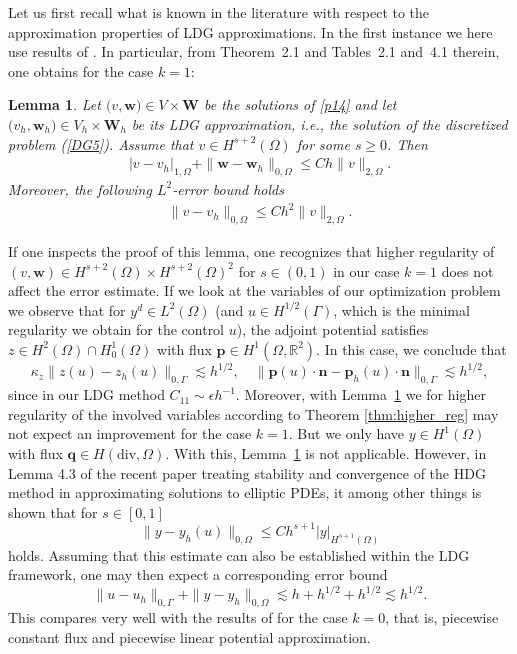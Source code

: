 \documentclass[a4paper,10pt]{article}
\newcommand{\bq}{{\mathbf{q}}}
\newcommand{\bw}{{\mathbf{w}}}
\newcommand{\bp}{{\mathbf{p}}}
\newcommand{\bn}{{\mathbf{n}}}
\newcommand{\bW}{{\mathbf{W}}}
\newtheorem{lemma}[theorem]{Lemma}
\numberwithin{theorem}{section}
\newcommand{\z}[2][blue]{#2}
\begin{document}
Let us first recall what is known in the literature with respect to the approximation properties of LDG approximations. In the first instance we here use results of \cite{PCastillo_BCockburn_IPergugia_DSchotzau_2000}. In particular, from Theorem~2.1 and Tables~2.1 and~4.1 therein, one obtains for the case $k=1$:
\begin{lemma}\label{smooth-solutions}
Let $\big(v,\bw \big) \in V \times \bW$ be the solutions of \eqref{p14} and let $\big(v_h,\bw_h \big) \in V_h \times \bW_h$ be its LDG approximation, i.e., the solution of the discretized problem  (\ref{DG5}). Assume that $v \in H^{s+2}(\Omega)$ for some $s\ge 0$. Then
\begin{eqnarray}\label{lemmaState1}
  |v-v_h|_{1,\Omega} + \|\bw-\bw_h\|_{0,\Omega} \leq C h \|v\|_{2,\Omega}.
\end{eqnarray}
Moreover, the following $L^2$-error bound holds
\begin{eqnarray}\label{lemmaState2}
  \|v-v_h\|_{0,\Omega}  \leq C h^2\|v\|_{2,\Omega}.
\end{eqnarray}
\end{lemma}
If one inspects the proof of this lemma, one recognizes that higher regularity of $(v,\bw)\in H^{s+2}(\Omega)\times H^{s+2}(\Omega)^2$ for $s\in (0,1)$ in our case $k=1$ does not affect the error estimate.
If we look at the variables of our optimization problem we observe that for $y^d\in L^2(\Omega)$ (and $u\in H^{1/2}(\Gamma)$, which is the minimal regularity we obtain for the control $u$), the adjoint potential satisfies $z\in H^2(\Omega)\cap H^1_0(\Omega)$ with flux $\bp\in H^1(\Omega,\mathbb{R}^2)$. In this case, we conclude that
\[
\kappa_z\|z(u)-z_h(u)\|_{0,\Gamma} \lesssim h^{1/2}, \quad \|\bp(u)\cdot \bn-\bp_h(u) \cdot \bn\|_{0,\Gamma} \lesssim h^{1/2},
\]
since in our LDG method $C_{11} \sim \epsilon h^{-1}$. Moreover, with Lemma~\ref{smooth-solutions} we for higher regularity of the involved variables according to Theorem \ref{thm:higher_reg} may not expect an improvement for the case $k=1$.
But we only have $y\in H^1(\Omega)$ with flux $\bq \in H(\mathrm{div},\Omega)$. With this, Lemma~\ref{smooth-solutions} is not applicable. However, in Lemma 4.3 of the recent paper \cite{JJiang_NJWalkington_YYue_2025} treating stability and convergence of the HDG method in approximating solutions to elliptic PDEs, it among other things is shown that for $s\in [0,1]$
\begin{equation}\label{L2est}
\|y-y_h(u)\|_{0,\Omega} \le Ch^{s+1} |y|_{H^{s+1}(\Omega)}
\end{equation}
holds. \z{Assuming that this estimate can also be established within the LDG framework, one may then expect a corresponding error bound}
\[\| u - u_h \|_{0,\Gamma}  + \|y-y_h\|_{0,\Omega} \lesssim h + h^{1/2} + h^{1/2} \lesssim h^{1/2}.\]
This compares very well with the results of \cite{WGong_WHu_MMateos_JSingler_XZhang_YZhang_2018} for the case $k=0$, that is, piecewise constant flux and piecewise linear potential approximation.
\end{document}
